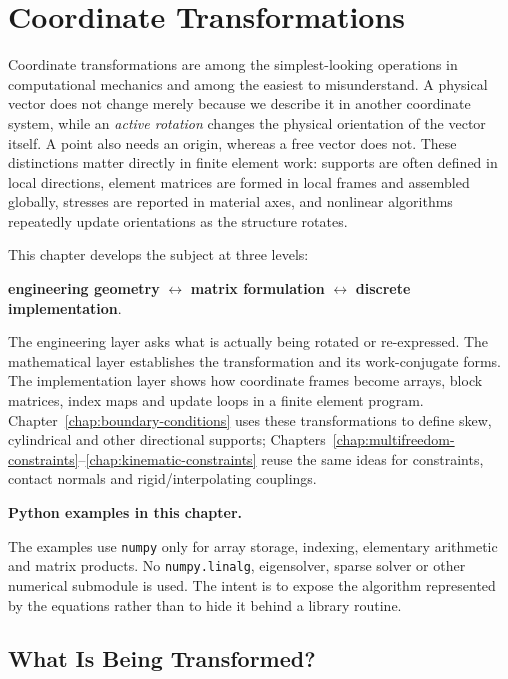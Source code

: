 \newpage
\chapter{Coordinate Transformations}\label{chap:coordinate-transformations}

Coordinate transformations are among the simplest-looking operations in
computational mechanics and among the easiest to misunderstand. A physical
vector does not change merely because we describe it in another coordinate
system, while an \emph{active rotation} changes the physical orientation of the
vector itself. A point also needs an origin, whereas a free vector does not.
These distinctions matter directly in finite element work: supports are often
defined in local directions, element matrices are formed in local frames and
assembled globally, stresses are reported in material axes, and nonlinear
algorithms repeatedly update orientations as the structure rotates.

This chapter develops the subject at three levels:

\begin{center}
\textbf{engineering geometry}
$\longleftrightarrow$
\textbf{matrix formulation}
$\longleftrightarrow$
\textbf{discrete implementation}.
\end{center}

The engineering layer asks what is actually being rotated or re-expressed. The
mathematical layer establishes the transformation and its work-conjugate forms.
The implementation layer shows how coordinate frames become arrays, block
matrices, index maps and update loops in a finite element program. Chapter~\ref{chap:boundary-conditions}
uses these transformations to define skew, cylindrical and other directional
supports; Chapters~\ref{chap:multifreedom-constraints}--\ref{chap:kinematic-constraints}
reuse the same ideas for constraints, contact normals and rigid/interpolating
couplings.

\begin{bbox}
\textbf{Python examples in this chapter.}

The examples use \texttt{numpy} only for array storage, indexing, elementary
arithmetic and matrix products. No \texttt{numpy.linalg}, eigensolver, sparse
solver or other numerical submodule is used. The intent is to expose the
algorithm represented by the equations rather than to hide it behind a library
routine.
\end{bbox}

\section{What Is Being Transformed?}

